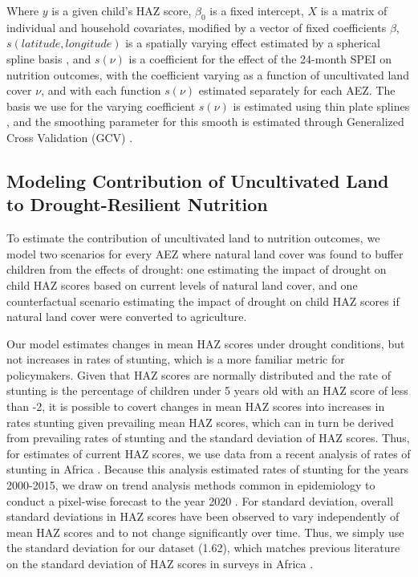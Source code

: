 \documentclass{article}
\begin{document}
Where $y$ is a given child's HAZ score, $\beta_0$ is a fixed intercept, $X$ is a matrix of individual and household covariates, modified by a vector of fixed coefficients $\beta$, $s(latitude, longitude)$ is a spatially varying effect estimated by a spherical spline basis \cite{Wahba1982}, and $s(\nu)$ is a coefficient for the effect of the 24-month SPEI on nutrition outcomes, with the coefficient varying as a function of uncultivated land cover $\nu$, and with each function $s(\nu)$ estimated separately for each AEZ.  The basis we use for the varying coefficient $s(\nu)$ is estimated using thin plate splines \cite{Duchon1977}, and the smoothing parameter for this smooth is estimated through Generalized Cross Validation (GCV) \cite{Wood2017}.

\subsection{Modeling Contribution of Uncultivated Land to Drought-Resilient Nutrition}
To estimate the contribution of uncultivated land to nutrition outcomes, we model two scenarios for every AEZ where natural land cover was found to buffer children from the effects of drought: one estimating the impact of drought on child HAZ scores based on current levels of natural land cover, and one counterfactual scenario estimating the impact of drought on child HAZ scores if natural land cover were converted to agriculture.

Our model estimates changes in mean HAZ scores under drought conditions, but not increases in rates of stunting, which is a more familiar metric for policymakers. Given that HAZ scores are normally distributed and the rate of stunting is the percentage of children under 5 years old with an HAZ score of less than -2, it is possible to covert changes in mean HAZ scores into increases in rates stunting given prevailing mean HAZ scores, which can in turn be derived from prevailing rates of stunting and the standard deviation of HAZ scores.  Thus, for estimates of current HAZ scores, we use data from a recent analysis of rates of stunting in Africa \cite{Osgood-Zimmerman2018}.  Because this analysis estimated rates of stunting for the years 2000-2015, we draw on trend analysis methods common in epidemiology to conduct a pixel-wise forecast to the year 2020 \cite{Fullman2017, Osgood-Zimmerman2018}.  For standard deviation, overall standard deviations in HAZ scores have been observed to vary independently of mean HAZ scores \cite{Mei2007} and to not change significantly over time.  Thus, we simply use the standard deviation for our dataset (1.62), which matches previous literature on the standard deviation of HAZ scores in surveys in Africa \cite{Mei2007}.
\end{document}
